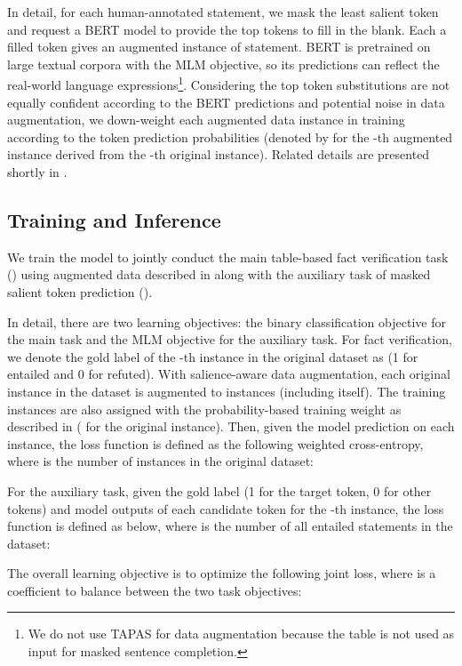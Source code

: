 \documentclass[11pt]{article}
\begin{document}
In detail,
for each human-annotated statement, we mask the least salient token and request a BERT model to provide the top  tokens to fill in the blank.
Each a filled token gives an augmented instance of statement.
BERT is pretrained on large textual corpora with the MLM objective, so its predictions can reflect the real-world language expressions\footnote{We do not use TAPAS for data augmentation because the table is not used as input for masked sentence completion.}.
Considering the top  token substitutions are not equally confident according to the BERT predictions and potential noise in data augmentation, 
we down-weight each augmented data instance in training according to the token prediction probabilities (denoted by  for the -th augmented instance derived from the -th original instance). 
Related details are presented shortly in .




\subsection{Training and Inference}\label{sec:training}
We train the model to jointly conduct the main table-based fact verification task () using augmented data described in  along with the auxiliary task of masked salient token prediction (). 

In detail, there are two learning objectives: the binary classification objective  for the main task and the MLM objective  for the auxiliary task. 
For fact verification, we denote the gold label of the -th instance in the original dataset as  (1 for entailed and 0 for refuted).
With salience-aware data augmentation,
each original instance in the dataset is augmented to  instances (including itself).
The training instances are also assigned with the probability-based training weight  as described in  ( for the original instance).
Then, given the model prediction  on each instance,
the loss function is defined as the following weighted cross-entropy, where  is the number of instances in the original dataset:

For the auxiliary task, given the gold label  (1 for the target token, 0 for other tokens) and model outputs  of each candidate token  for the -th instance, the loss function is defined as below, where  is the number of all entailed statements in the dataset:
 
The overall learning objective is to optimize the following joint loss, where  is a coefficient to balance between the two task objectives:
 
\end{document}
